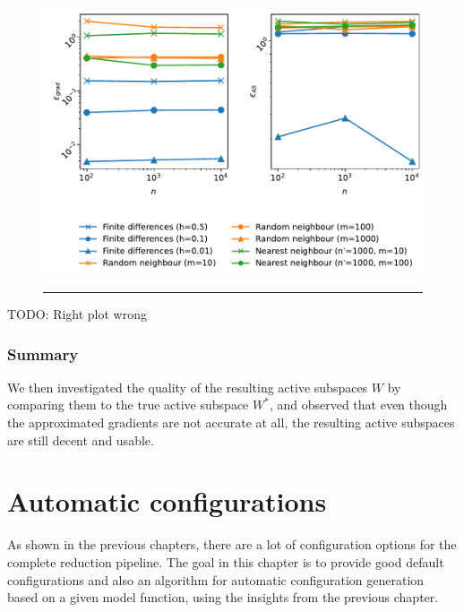 \documentclass[
  a4paper,  %
  twoside,  %
  bibliography=totoc,
  headsepline,
  cleardoublepage=empty,
  parskip=half,
  draft=false
]{scrbook}
\newcommand{\delimit}{{\color{silver}\noindent\rule{\textwidth}{1pt}}}
\begin{document}
\begin{mdframed}[style=style]
\begin{figure}[H]
\centering
	\includegraphics[width=\textwidth]{graphics/as_errors_f2}
	
\delimit
	\label{fig:as_grad_errors_f2}
\end{figure}
\end{mdframed}

TODO: Right plot wrong

\subsection{Summary}

We then investigated the quality of the resulting active subspaces $W$ by comparing them to the true active subspace $W^\ast$, and observed that even though the approximated gradients are not accurate at all, the resulting active subspaces are still decent and usable.


\chapter{Automatic configurations}
\label{chap:c8}

As shown in the previous chapters, there are a lot of configuration options for the complete reduction pipeline.
The goal in this chapter is to provide good default configurations and also an algorithm for automatic configuration generation based on a given model function, using the insights from the previous chapter.
\end{document}
